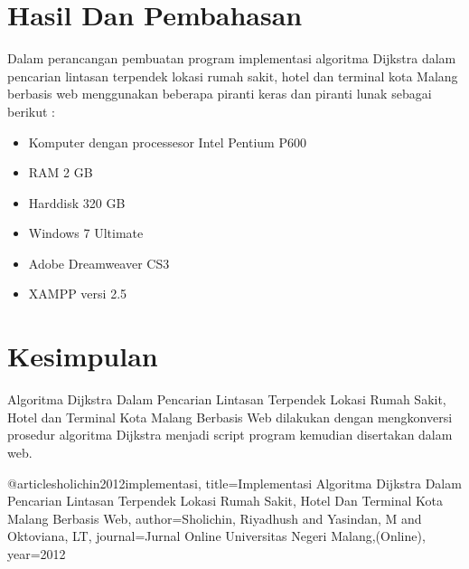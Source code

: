 \documentclass[conference]{IEEEtran}
\begin{document}
\section{Hasil Dan Pembahasan}
Dalam perancangan pembuatan program implementasi algoritma Dijkstra dalam
pencarian lintasan terpendek lokasi rumah sakit, hotel dan terminal kota Malang berbasis web
menggunakan beberapa piranti keras dan piranti lunak sebagai berikut :
\begin{itemize}
    \item Komputer dengan processesor Intel Pentium P600
    \item RAM 2 GB
    \item Harddisk 320 GB
    \item Windows 7 Ultimate
    \item Adobe Dreamweaver CS3
    \item XAMPP versi 2.5
  \end{itemize}
\section{Kesimpulan}
Algoritma Dijkstra Dalam Pencarian Lintasan
Terpendek Lokasi Rumah Sakit, Hotel dan Terminal Kota Malang Berbasis Web dilakukan
dengan mengkonversi prosedur algoritma Dijkstra menjadi script program kemudian
disertakan dalam web.


@article{sholichin2012implementasi,
  title={Implementasi Algoritma Dijkstra Dalam Pencarian Lintasan Terpendek Lokasi Rumah Sakit, Hotel Dan Terminal Kota Malang Berbasis Web},
  author={Sholichin, Riyadhush and Yasindan, M and Oktoviana, LT},
  journal={Jurnal Online Universitas Negeri Malang,(Online)},
  year={2012}
}

\end{document}
